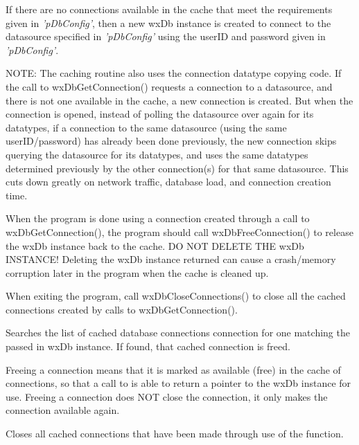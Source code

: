 If there are no connections available in the cache that meet the requirements 
given in {\it'pDbConfig'}, then a new wxDb instance is created to connect 
to the datasource specified in {\it'pDbConfig'} using the userID and password 
given in {\it'pDbConfig'}.

NOTE: The caching routine also uses the  
connection datatype copying code.  If the call to wxDbGetConnection() 
requests a connection to a datasource, and there is not one available in the 
cache, a new connection is created.  But when the connection is opened, 
instead of polling the datasource over again for its datatypes, if a 
connection to the same datasource (using the same userID/password) has already 
been done previously, the new connection skips querying the datasource for 
its datatypes, and uses the same datatypes determined previously by the 
other connection(s) for that same datasource.  This cuts down greatly on 
network traffic, database load, and connection creation time.

When the program is done using a connection created through a call to 
wxDbGetConnection(), the program should call wxDbFreeConnection() to release 
the wxDb instance back to the cache.  DO NOT DELETE THE wxDb INSTANCE!  
Deleting the wxDb instance returned can cause a crash/memory corruption 
later in the program when the cache is cleaned up.

When exiting the program, call wxDbCloseConnections() to close all the 
cached connections created by calls to wxDbGetConnection().




Searches the list of cached database connections connection for one matching 
the passed in wxDb instance.  If found, that cached connection is freed.

Freeing a connection means that it is marked as available (free) in the 
cache of connections, so that a call to  
is able to return a pointer to the wxDb instance for use.  Freeing a 
connection does NOT close the connection, it only makes the connection 
available again.
 



Closes all cached connections that have been made through use of the 
 function.  

